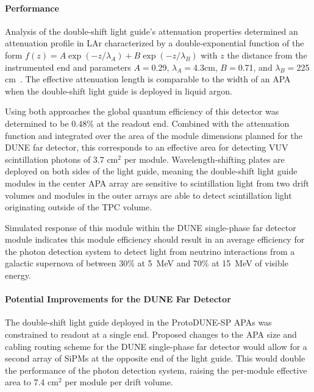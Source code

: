 \paragraph*{Performance}

Analysis of the double-shift light guide's attenuation properties determined 
an attenuation profile in LAr characterized by a double-exponential function
 of the form $f(z) = A \exp(-z/\lambda_{A}) + B \exp(-z/\lambda_B)$ with $z$ 
the distance from the instrumented end and parameters $A = $0.29,
 $\lambda_A = $4.3cm, $B = $0.71, and $\lambda_B = $225 cm~\cite{bib:DoubleShiftLG-NIM-171113}. 
The effective attenuation length is comparable to the width of an APA 
when the double-shift light guide is deployed in liquid argon.

Using both approaches the global quantum efficiency of this detector was 
determined to be 0.48\% at the readout end. Combined with the attenuation 
function and integrated over the area of the module dimensions planned for
 the DUNE far detector, this corresponds to an effective area for detecting
 VUV scintillation photons of 3.7 cm$^{2}$ per module. Wavelength-shifting 
plates are deployed on both sides of the light guide, meaning the double-shift
 light guide modules in the center APA array are sensitive to scintillation 
light from two drift volumes and modules in the outer arrays are able to detect
 scintillation light originating outside of the TPC volume.

Simulated response of this module within the DUNE single-phase far detector module 
indicates this module efficiency should result in an average efficiency for the 
photon detection system to detect light from neutrino interactions from a galactic 
supernova of between 30\% at 5~MeV and 70\% at 15~MeV of visible energy.

\paragraph*{Potential Improvements for the DUNE Far Detector}

The double-shift light guide deployed in the ProtoDUNE-SP APAs was constrained 
to readout at a single end. Proposed changes to the APA size and cabling routing 
scheme for the DUNE single-phase far detector would allow for a second array of 
SiPMs at the opposite end of the light guide. This would double the performance of
 the photon detection system, raising the per-module effective area to 7.4 cm$^{2}$ 
per module per drift volume.

